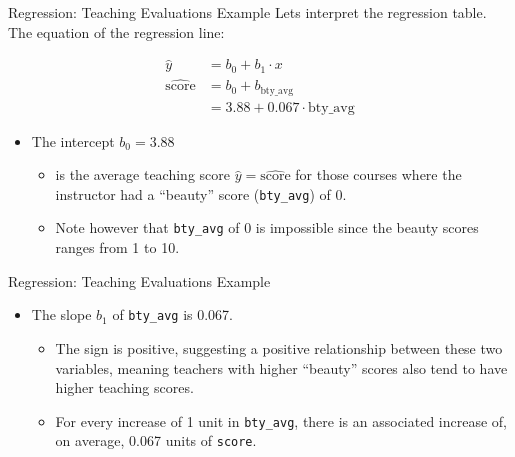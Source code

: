 \documentclass[
  ignorenonframetext,
]{beamer}
\providecommand{\tightlist}{%
  \setlength{\itemsep}{0pt}\setlength{\parskip}{0pt}}
\begin{document}
\begin{frame}[fragile]{Regression: Teaching Evaluations Example}
\label{regression-teaching-evaluations-example-5}
Lets interpret the regression table. The equation of the regression
line:

\[
\begin{aligned}
\hat{y} &= b_0 +b_1\cdot x \\
\widehat{\text{score}} &= b_0 + b_{\text{bty\_avg}}\\
&= 3.88 + 0.067\cdot\text{bty\_avg}
\end{aligned}
\]

\begin{itemize}
\item
  The intercept \(b_0 = 3.88\)

  \begin{itemize}
  \tightlist
  \item
    is the average teaching score \(\hat{y}=\widehat{\text{score}}\) for
    those courses where the instructor had a ``beauty'' score
    (\texttt{bty\_avg}) of 0.
  \item
    Note however that \texttt{bty\_avg} of 0 is impossible since the
    beauty scores ranges from 1 to 10.
  \end{itemize}
\end{itemize}
\end{frame}

\begin{frame}[fragile]{Regression: Teaching Evaluations Example}
\label{regression-teaching-evaluations-example-6}
\begin{itemize}
\item
  The slope \(b_1\) of \texttt{bty\_avg} is 0.067.

  \begin{itemize}
  \tightlist
  \item
    The sign is positive, suggesting a positive relationship between
    these two variables, meaning teachers with higher ``beauty'' scores
    also tend to have higher teaching scores.
  \item
    For every increase of 1 unit in \texttt{bty\_avg}, there is an
    associated increase of, on average, 0.067 units of \texttt{score}.
  \end{itemize}
\end{itemize}
\end{frame}
\end{document}
